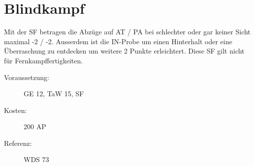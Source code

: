 \section{Blindkampf}
\label{sf.blindkampf}
Mit der SF  betragen die Abzüge auf AT / PA bei schlechter oder gar keiner Sicht maximal -2 / -2.
Ausserdem ist die IN-Probe um einen Hinterhalt oder eine Überraschung zu entdecken um weitere 2 Punkte erleichtert.
Diese SF gilt nicht für Fernkampffertigkeiten.

\begin{description}
    \item[Voraussetzung:]
        GE 12, TaW  15, SF 
    \item [Kosten:]
        200 AP
    \item [Referenz:]
        WDS 73
\end{description}
